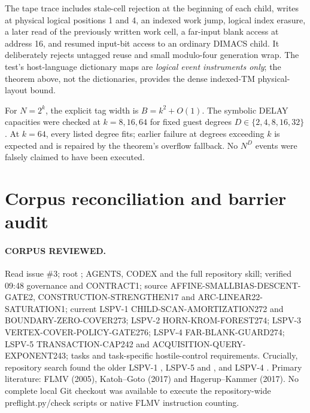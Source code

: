 \documentclass[11pt]{article}
\begin{document}
The tape trace includes stale-cell rejection at the beginning of each child, writes at physical logical positions 1 and 4, an indexed work jump, logical index erasure, a later read of the previously written work cell, a far-input blank access at address 16, and resumed input-bit access to an ordinary DIMACS child. It deliberately rejects untagged reuse and small modulo-four generation wrap. The test's host-language dictionary maps are \emph{logical event instruments only}; the theorem above, not the dictionaries, provides the dense indexed-TM physical-layout bound.

For $N=2^k$, the explicit tag width is $B=k^2+O(1)$. The symbolic DELAY capacities were checked at $k=8,16,64$ for fixed guest degrees $D\in\{2,4,8,16,32\}$. At $k=64$, every listed degree fits; earlier failure at degrees exceeding $k$ is expected and is repaired by the theorem's overflow fallback. No $N^D$ events were falsely claimed to have been executed.

\section{Corpus reconciliation and barrier audit}
\paragraph{CORPUS REVIEWED.}
Read issue \#3; root ; AGENTS, CODEX and the full repository  skill; verified 09:48 governance and CONTRACT1; source AFFINE-SMALLBIAS-DESCENT-GATE2, CONSTRUCTION-STRENGTHEN17 and ARC-LINEAR22-SATURATION1; current LSPV-1 CHILD-SCAN-AMORTIZATION272 and BOUNDARY-ZERO-COVER273; LSPV-2 HORN-KROM-FOREST274; LSPV-3 VERTEX-COVER-POLICY-GATE276; LSPV-4 FAR-BLANK-GUARD274; LSPV-5 TRANSACTION-CAP242 and ACQUISITION-QUERY-EXPONENT243; tasks and task-specific hostile-control requirements. Crucially, repository search found the older LSPV-1 , LSPV-5  and , and LSPV-4 . Primary literature: FLMV (2005), Katoh--Goto (2017) and Hagerup--Kammer (2017). No complete local Git checkout was available to execute the repository-wide preflight.py/check scripts or native FLMV instruction counting.
\end{document}
